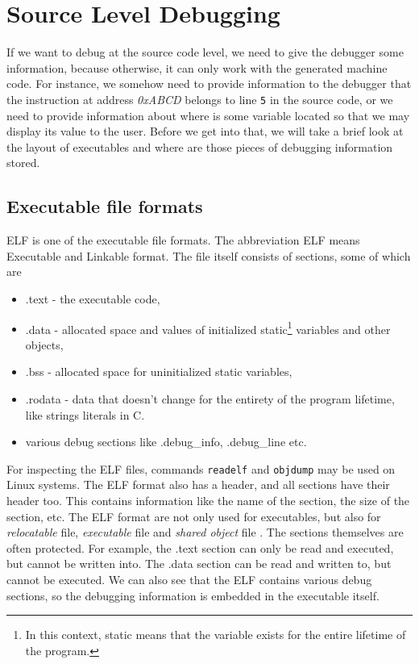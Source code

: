 \section{Source Level Debugging}\label{section:source-level-debugging}
If we want to debug at the source code level, we need to give the debugger some
information, because otherwise, it can only work with the generated machine
code. For instance, we somehow need to provide information to the debugger that
the instruction at address \textit{0xABCD} belongs to line \texttt{5} in the
source code, or we need to provide information about where is some variable
located so that we may display its value to the user. Before we get into that,
we will take a brief look at the layout of executables and where are those
pieces of debugging information stored.

\subsection{Executable file formats}
ELF is one of the executable file formats. The abbreviation ELF means
Executable and Linkable format. The file itself consists of sections, some of
which are
\begin{itemize}
    \item .text - the executable code,
    \item .data - allocated space and values of initialized static\footnote{In
        this context, static means that the variable exists for the entire
        lifetime of the program.} variables and other objects,
    \item .bss - allocated space for uninitialized static variables,
    \item .rodata - data that doesn't change for the entirety of the program
        lifetime, like strings literals in C.
    \item various debug sections like .debug\_info, .debug\_line etc.
\end{itemize}
For inspecting the ELF files, commands \texttt{readelf} and \texttt{objdump}
may be used on Linux systems. The ELF format also has a header, and all
sections have their header too. This contains information like the name of the
section, the size of the section, etc. The ELF format are not only used for
executables, but also for \textit{relocatable} file, \textit{executable} file
and \textit{shared object} file \cite{elf}. The sections themselves are often
protected. For example, the .text section can only be read and executed, but
cannot be written into. The .data section can be read and written to, but
cannot be executed. We can also see that the ELF contains various debug
sections, so the debugging information is embedded in the executable itself.

